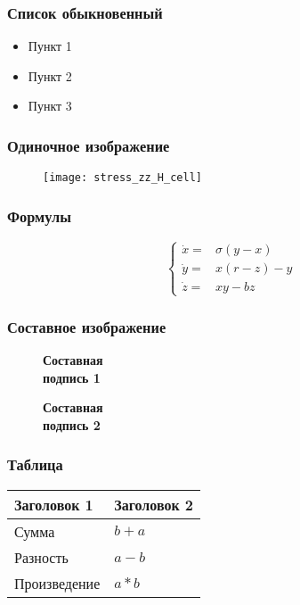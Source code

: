 \documentclass[14pt]{beamer}
\begin{document}
\begin{frame}
\frametitle{Список обыкновенный}
\begin{itemize}
  \item Пункт 1
  \item Пункт 2
  \item Пункт 3
\end{itemize}
\end{frame}

\begin{frame}
\frametitle{Одиночное изображение}
\begin{figure}[H]
  \center
  \texttt{[image: stress\_zz\_H\_cell]}
\end{figure}
\end{frame}

\begin{frame}
\frametitle{Формулы}
$$
\left\{
  \begin{array}{rl}
    \dot x = & \sigma (y-x) \\
    \dot y = & x (r - z) - y \\
    \dot z = & xy - bz
  \end{array}
\right.
$$
\end{frame}

\begin{frame}
\frametitle{Составное изображение}
\begin{figure}[h]
  \begin{minipage}[h]{0.49\linewidth}
    \textbf{Составная \\ подпись 1}
  \end{minipage}
  \hfill
  \begin{minipage}[h]{0.49\linewidth}
    \textbf{Составная \\ подпись 2}
  \end{minipage}
\end{figure}
\end{frame}

\begin{frame}
\frametitle{Таблица}
\begin{tabular}{|l|l|}
\hline
\textbf{Заголовок 1} & \textbf{Заголовок 2} \\
\hline
Сумма & $b+a$ \\
\hline
Разность & $a-b$ \\
\hline
Произведение & $a*b$ \\
\hline
\end{tabular}
\end{frame}
\end{document}
